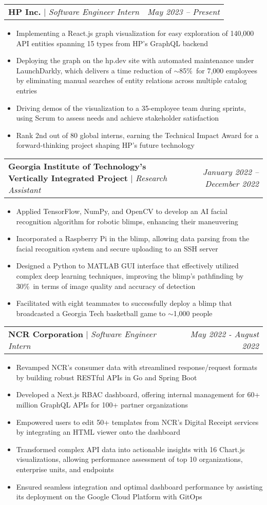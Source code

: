 \documentclass[letterpaper,10pt]{article}
\makeatletter
\newcommand{\resumeItem}[1]{
  \item\small{ %
    {#1 \vspace{-2pt}}
  }
}
\newcommand{\resumeSubSubheadingOneLine}[2]{
    \item
    \begin{tabular*}{0.97\textwidth}{l@{\extracolsep{\fill}}r}
      \small{#1} & #2 \\ %
    \end{tabular*}\vspace{-7pt}
}
\newcommand{\resumeItemListStart}{\begin{itemize}}
\newcommand{\resumeItemListEnd}{\end{itemize}\vspace{-5pt}}
\makeatother
\begin{document}
    \resumeSubSubheadingOneLine
        {\textbf{HP Inc.} $|$ \emph{Software Engineer Intern}}{\emph{May 2023 -- Present}}
        \resumeItemListStart
            \resumeItem{Implementing a React.js graph visualization for easy exploration of 140,000 API entities spanning 15 types from HP's GraphQL backend}
            \resumeItem{Deploying the graph on the hp.dev site with automated maintenance under LaunchDarkly, which delivers a time reduction of $\sim$85\%\ for 7,000 employees by eliminating manual searches of entity relations across multiple catalog entries}
            \resumeItem{Driving demos of the visualization to a 35-employee team during sprints, using Scrum to assess needs and achieve stakeholder satisfaction}
            \resumeItem{Rank 2nd out of 80 global interns, earning the Technical Impact Award for a forward-thinking project shaping HP's future technology}
        \resumeItemListEnd
        
    \resumeSubSubheadingOneLine
        {\textbf{Georgia Institute of Technology’s Vertically Integrated Project} $|$ \emph{Research Assistant}}{\emph{January 2022 -- December 2022}}
        \resumeItemListStart
            \resumeItem{Applied TensorFlow, NumPy, and OpenCV to develop an AI facial recognition algorithm for robotic blimps, enhancing their maneuvering}
            \resumeItem{Incorporated a Raspberry Pi in the blimp, allowing data parsing from the facial recognition system and secure uploading to an SSH server}\\
            \resumeItem{Designed a Python to MATLAB GUI interface that effectively utilized complex deep learning techniques, improving the blimp's pathfinding by 30\%\ in terms of image quality and accuracy of detection}
            \resumeItem{Facilitated with eight teammates to successfully deploy a blimp that broadcasted a Georgia Tech basketball game to $\sim$1,000 people}
        \resumeItemListEnd

    \resumeSubSubheadingOneLine
        {\textbf{NCR Corporation} $|$ \emph{Software Engineer Intern}}{\emph{May 2022 - August 2022}}
        \resumeItemListStart
            \resumeItem{Revamped NCR's consumer data with streamlined response/request formats by building robust RESTful APIs in Go and Spring Boot}
            \resumeItem{Developed a Next.js RBAC dashboard, offering internal management for 60+ million GraphQL APIs for 100+ partner organizations}
            \resumeItem{Empowered users to edit 50+ templates from NCR's Digital Receipt services by integrating an HTML viewer onto the dashboard}
            \resumeItem{Transformed complex API data into actionable insights with 16 Chart.js visualizations, allowing performance assessment of top 10 organizations, enterprise units, and endpoints}
            \resumeItem{Ensured seamless integration and optimal dashboard performance by assisting its deployment on the Google Cloud Platform with GitOps}
      \resumeItemListEnd
\end{document}
